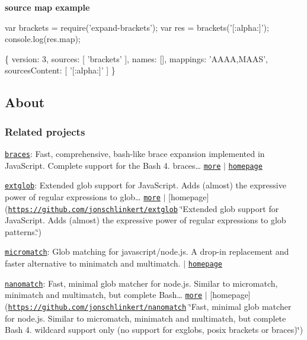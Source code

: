 {\bfseries source map example}


\begin{DoxyCode}
var brackets = require('expand-brackets');
var res = brackets('[:alpha:]');
console.log(res.map);

\{ version: 3,
     sources: [ 'brackets' ],
     names: [],
     mappings: 'AAAA,MAAS',
     sourcesContent: [ '[:alpha:]' ] \}
\end{DoxyCode}


\subsection*{About}

\subsubsection*{Related projects}


\begin{DoxyItemize}
\item \href{https://www.npmjs.com/package/braces}{\tt braces}\+: Fast, comprehensive, bash-\/like brace expansion implemented in Java\+Script. Complete support for the Bash 4. braces… \href{https://github.com/jonschlinkert/braces}{\tt more} $\vert$ \href{https://github.com/jonschlinkert/braces}{\tt homepage}
\item \href{https://www.npmjs.com/package/extglob}{\tt extglob}\+: Extended glob support for Java\+Script. Adds (almost) the expressive power of regular expressions to glob… \href{https://github.com/jonschlinkert/extglob}{\tt more} $\vert$ \mbox{[}homepage\mbox{]}(\href{https://github.com/jonschlinkert/extglob}{\tt https\+://github.\+com/jonschlinkert/extglob} \char`\"{}\+Extended glob support for Java\+Script. Adds (almost) the expressive power of regular expressions to glob patterns.\char`\"{})
\item \href{https://www.npmjs.com/package/micromatch}{\tt micromatch}\+: Glob matching for javascript/node.\+js. A drop-\/in replacement and faster alternative to minimatch and multimatch. $\vert$ \href{https://github.com/jonschlinkert/micromatch}{\tt homepage}
\item \href{https://www.npmjs.com/package/nanomatch}{\tt nanomatch}\+: Fast, minimal glob matcher for node.\+js. Similar to micromatch, minimatch and multimatch, but complete Bash… \href{https://github.com/jonschlinkert/nanomatch}{\tt more} $\vert$ \mbox{[}homepage\mbox{]}(\href{https://github.com/jonschlinkert/nanomatch}{\tt https\+://github.\+com/jonschlinkert/nanomatch} \char`\"{}\+Fast, minimal glob matcher for node.\+js. Similar to micromatch, minimatch and multimatch, but complete Bash 4. wildcard support only (no support for exglobs, posix brackets or braces)\char`\"{})
\end{DoxyItemize}

